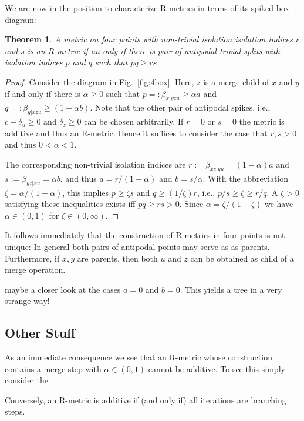 \documentclass{article}
\newtheorem{theorem}{Theorem}
\newcommand{\TODO}[1]{\begingroup\color{red}#1\endgroup}
\begin{document}
We are now in the position to characterize R-metrics in terms of its spiked
box diagram:
\begin{theorem}
  A metric on four points with non-trivial isolation isolation indices
  $r$ and $s$ is an R-metric if an only if there is pair of antipodal
  trivial splits with isolation indices $p$ and $q$ such that
  $p q \ge r s$. 
\end{theorem}
\begin{proof}
  Consider the diagram in Fig.~\ref{fig:4box}. Here, $z$ is a merge-child
  of $x$ and $y$ if and only if there is $\alpha\ge 0$ such that
  $p=:\beta_{x|yzu}\ge \alpha a$ and $q=:\beta_{y|xzu}\ge (1-\alpha
  b)$. Note that the other pair of antipodal spikes, i.e., $c+\delta_u\ge0$
  and $\delta_z\ge0$ can be chosen arbitrarily. If $r=0$ or $s=0$ the
  metric is additive and thus an R-metric. Hence it suffices to consider
  the case that $r,s>0$ and thus $0<\alpha<1$.

  The corresponding non-trivial isolation indices are
  $r:=\beta_{xz|yu}=(1-\alpha)a$ and $s:=\beta_{yz|xu}=\alpha b$, and thus
  $a=r/(1-\alpha)$ and $b=s/\alpha$. With the abbreviation
  $\zeta=\alpha/(1-\alpha)$, this implies $p\ge \zeta s$ and
  $q\ge (1/\zeta) r$, i.e., $p/s \ge \zeta \ge r/q$. A $\zeta>0$ satisfying
  these inequalities exists iff $p q \ge r s>0$. Since
  $\alpha = \zeta/(1+\zeta)$ we have $\alpha\in (0,1)$ for
  $\zeta\in(0,\infty)$.
\end{proof}

It follows immediately that the construction of R-metrics in four points is
not unique: In general both pairs of antipodal points may serve as as
parents. Furthermore, if $x,y$ are parents, then both $u$ and $z$ can be
obtained as child of a merge operation.


\TODO{maybe a closer look at the cases $a=0$ and $b=0$. This yields a tree
  in a very strange way!}




\subsection*{Other Stuff} 



As an immediate consequence we see that an R-metric whose construction
contains a merge step with $\alpha\in(0,1)$ cannot be additive. To see this
simply consider the 






Conversely, an
R-metric is additive if (and only if) all iterations are branching steps.
\end{document}
